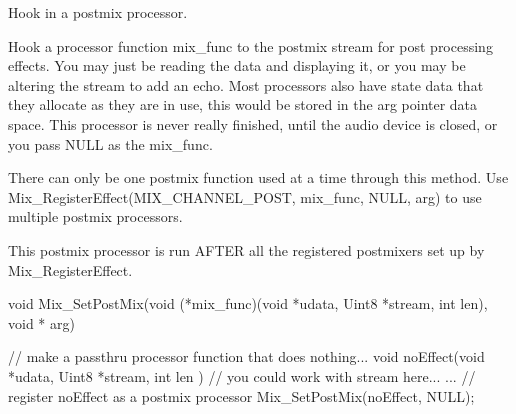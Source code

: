 Hook in a postmix processor. 

Hook a processor function mix\_\-func to the postmix stream for post processing effects. You may just be reading the data and displaying it, or you may be altering the stream to add an echo. Most processors also have state data that they allocate as they are in use, this would be stored in the arg pointer data space. This processor is never really finished, until the audio device is closed, or you pass NULL as the mix\_\-func. 

There can only be one postmix function used at a time through this method. Use Mix\_\-RegisterEffect(MIX\_\-CHANNEL\_\-POST, mix\_\-func, NULL, arg) to use multiple postmix processors. 

This postmix processor is run AFTER all the registered postmixers set up by Mix\_\-RegisterEffect. 


\begin{DoxyCode}
void Mix_SetPostMix(void (*mix_func)(void *udata, Uint8 *stream, int len), void *
      arg)
\end{DoxyCode}
 


\begin{DoxyCode}
                    // make a passthru processor function that does nothing...
                                void noEffect(void *udata, Uint8 *stream, int len
      )
                                {
                                        // you could work with stream here...
                                }
                                ...
                                // register noEffect as a postmix processor
                                Mix_SetPostMix(noEffect, NULL);
\end{DoxyCode}
 


